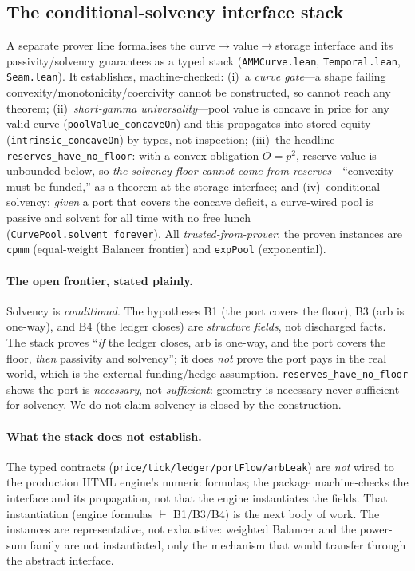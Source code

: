 \documentclass[runningheads]{llncs}
\newcommand{\tfp}{\emph{trusted-from-prover}}
\begin{document}
\subsection{The conditional-solvency interface stack}
A separate prover line formalises the curve$\to$value$\to$storage interface and
its passivity/solvency guarantees as a typed stack (\texttt{AMMCurve.lean},
\texttt{Temporal.lean}, \texttt{Seam.lean}). It establishes, machine-checked:
(i)~a \emph{curve gate}---a shape failing convexity/monotonicity/coercivity
cannot be constructed, so cannot reach any theorem; (ii)~\emph{short-gamma
universality}---pool value is concave in price for any valid curve
(\texttt{poolValue\_concaveOn}) and this propagates into stored equity
(\texttt{intrinsic\_concaveOn}) by types, not inspection; (iii)~the headline
\texttt{reserves\_have\_no\_floor}: with a convex obligation $O=p^{2}$, reserve
value is unbounded below, so \emph{the solvency floor cannot come from
reserves}---``convexity must be funded,'' as a theorem at the storage interface;
and (iv)~conditional solvency: \emph{given} a port that covers the concave
deficit, a curve-wired pool is passive and solvent for all time with no free lunch
(\texttt{CurvePool.solvent\_forever}). All \tfp{}; the proven instances are
\texttt{cpmm} (equal-weight Balancer frontier) and \texttt{expPool}
(exponential).

\paragraph{The open frontier, stated plainly.}
Solvency is \emph{conditional}. The hypotheses B1 (the port covers the floor), B3
(arb is one-way), and B4 (the ledger closes) are \emph{structure fields}, not
discharged facts. The stack proves ``\emph{if} the ledger closes, arb is one-way,
and the port covers the floor, \emph{then} passivity and solvency''; it does
\emph{not} prove the port pays in the real world, which is the external
funding/hedge assumption. \texttt{reserves\_have\_no\_floor} shows the port is
\emph{necessary}, not \emph{sufficient}: geometry is necessary-never-sufficient for
solvency. We do not claim solvency is closed by the construction.

\paragraph{What the stack does not establish.}
The typed contracts (\texttt{price/tick/ledger/portFlow/arbLeak}) are \emph{not}
wired to the production HTML engine's numeric formulas; the package machine-checks the
interface and its propagation, not that the engine instantiates the fields. That
instantiation (engine formulas $\vdash$ B1/B3/B4) is the next body of work. The
instances are representative, not exhaustive: weighted Balancer and the power-sum
family are not instantiated, only the mechanism that would transfer through the
abstract interface.
\end{document}
